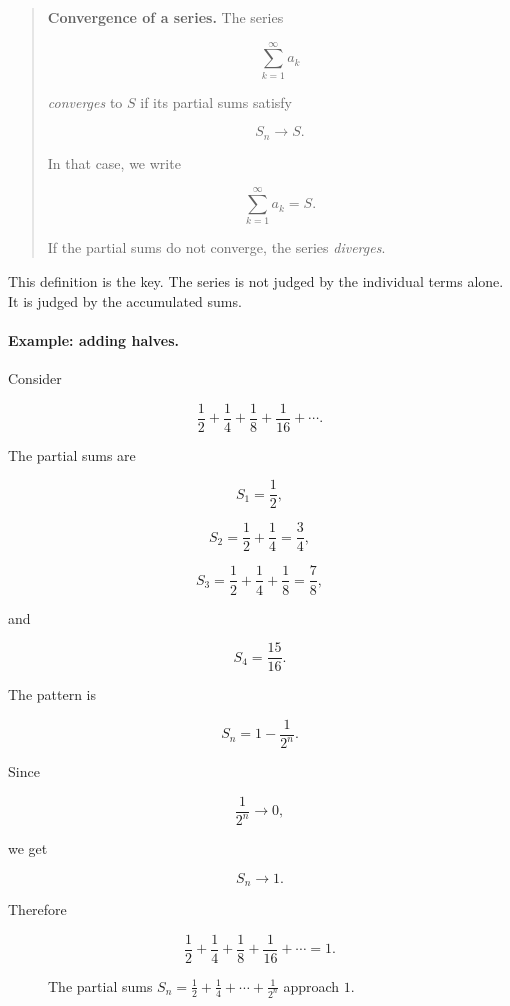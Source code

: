 \begin{quote}
\textbf{Convergence of a series.}
The series

\[
\sum_{k=1}^{\infty}a_k
\]

\emph{converges} to \(S\) if its partial sums satisfy

\[
S_n\to S.
\]

In that case, we write

\[
\sum_{k=1}^{\infty}a_k=S.
\]

If the partial sums do not converge, the series \emph{diverges}.
\end{quote}

This definition is the key.  The series is not judged by the individual terms alone.  It is
judged by the accumulated sums.

\paragraph{Example: adding halves.}
Consider

\[
\frac12+\frac14+\frac18+\frac1{16}+\cdots.
\]

The partial sums are

\[
S_1=\frac12,
\]

\[
S_2=\frac12+\frac14=\frac34,
\]

\[
S_3=\frac12+\frac14+\frac18=\frac78,
\]

and

\[
S_4=\frac{15}{16}.
\]

The pattern is

\[
S_n=1-\frac1{2^n}.
\]

Since

\[
\frac1{2^n}\to0,
\]

we get

\[
S_n\to1.
\]

Therefore

\[
\boxed{
\frac12+\frac14+\frac18+\frac1{16}+\cdots=1.
}
\]

\begin{figure}[h]
\centering
{}
\caption{The partial sums \(S_n=\frac12+\frac14+\cdots+\frac1{2^n}\) approach \(1\).}
\label{fig:partial-sums-halves}
\end{figure}

